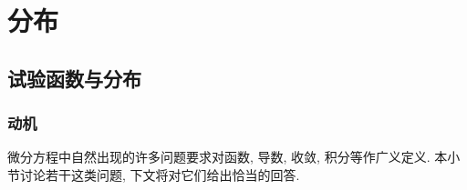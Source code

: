 \section{分布}\label{chap:distributions}\label{chap:fourier-transform}

\subsection{试验函数与分布}\label{sec:test-functions-distributions}

\subsubsection{动机}\label{subsec:distributions-motivation}

微分方程中自然出现的许多问题要求对函数, 导数, 收敛, 积分等作广义定义. 本小节讨论若干这类问题, 下文将对它们给出恰当的回答.

